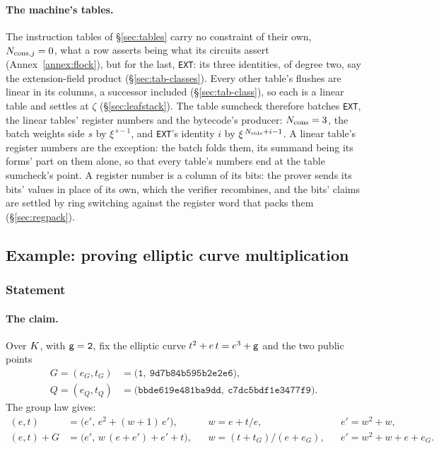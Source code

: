 \paragraph{The machine's tables.} The instruction tables of \S\ref{sec:tables} carry no constraint of their own, $N_{\mathrm{cons},j}=0$, what a row asserts being what its circuits assert (Annex~\ref{annex:flock}), but for the last, \texttt{EXT}: its three identities, of degree two, say the extension-field product (\S\ref{sec:tab-classes}). Every other table's flushes are linear in its columns, a successor included (\S\ref{sec:tab-class}), so each is a linear table and settles at $\zeta$ (\S\ref{sec:leafstack}). The table sumcheck therefore batches \texttt{EXT}, the linear tables' register numbers and the bytecode's producer: $N_{\mathrm{cons}}=3$, the batch weights side $s$ by $\xi^{\,s-1}$, and \texttt{EXT}'s identity $i$ by $\xi^{\,N_{\mathrm{side}}+i-1}$. A linear table's register numbers are the exception: the batch folds them, its summand being its forms' part on them alone, so that every table's numbers end at the table sumcheck's point. A register number is a column of its bits: the prover sends its bits' values in place of its own, which the verifier recombines, and the bits' claims are settled by ring switching against the register word that packs them (\S\ref{sec:regpack}).

\subsection{Example: proving elliptic curve multiplication}\label{sec:arith-example}

\subsubsection{Statement}

\paragraph{The claim.} Over $K$, with $\mathsf{g}=\mathtt{2}$, fix the elliptic curve $t^{2}+e\,t=e^{3}+\mathsf{g}$ and the two public points
\begin{align*}
  G=(e_G,t_G)&=\bigl(\mathtt{1},\ \mathtt{9d7b84b595b2e2e6}\bigr),\\
  Q=(e_Q,t_Q)&=\bigl(\mathtt{bbde619e481ba9dd},\ \mathtt{c7dc5bdf1e3477f9}\bigr).
\end{align*}
The group law gives:
\begin{align*}
  [2](e,t)&=\bigl(e',\,e^{2}+(w+1)\,e'\bigr), &&w=e+t/e, &&e'=w^{2}+w,\\
  (e,t)+G&=\bigl(e',\,w\,(e+e')+e'+t\bigr), &&w=(t+t_G)/(e+e_G), &&e'=w^{2}+w+e+e_G .
\end{align*}

